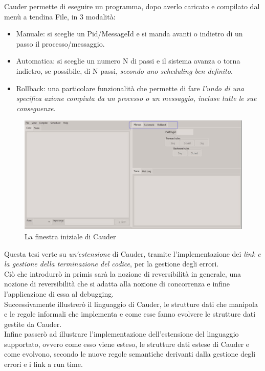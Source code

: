 \documentclass[Tesi.tex]{subfiles}
\begin{document}
Cauder permette di eseguire un programma, dopo averlo caricato e compilato dal menù a tendina File, in 3 modalità:
\begin{itemize}
	\item Manuale: si sceglie un Pid/MessageId e si manda avanti o indietro di un passo il processo/messaggio.
	\item Automatica: si sceglie un numero N di passi e il sistema avanza o torna indietro, se possibile, di N passi, \textit{secondo uno scheduling ben definito}.
	\item Rollback: una particolare funzionalità che permette di fare \textit{l'undo di una specifica azione compiuta da un processo o un messaggio, incluse tutte le sue conseguenze}. 
\end{itemize}
\begin{figure}[H]
\centerline{\includegraphics[scale=0.4]{./Files/CauderPanoramica}}
\caption{La finestra iniziale di Cauder}
\label{fig1}
\end{figure}
Questa tesi verte su \textit{un'estensione} di Cauder, tramite l'implementazione dei \textit{link e la gestione della terminazione del codice}, per la gestione degli errori.\\
Ciò che introdurrò in primis sarà la nozione di reversibilità in generale, una nozione di reversibilità che si adatta alla nozione di concorrenza e infine l'applicazione di essa al debugging.\\
Successivamente illustrerò il linguaggio di Cauder, le strutture dati che manipola e le regole informali che implementa e come esse fanno evolvere le strutture dati gestite da Cauder.\\
Infine passerò ad illustrare l’implementazione dell’estensione del linguaggio supportato, ovvero come esso viene esteso, le strutture dati estese di  Cauder e come evolvono, secondo le nuove regole semantiche derivanti dalla gestione degli errori e i link a run time.
\end{document}
